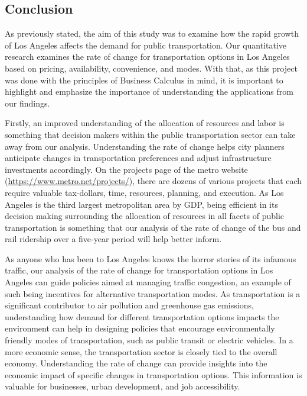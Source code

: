 \documentclass[
]{article}
\begin{document}
\newpage

\hypertarget{conclusion}{%
\subsection{Conclusion}\label{conclusion}}

As previously stated, the aim of this study was to examine how the rapid
growth of Los Angeles affects the demand for public transportation. Our
quantitative research examines the rate of change for transportation
options in Los Angeles based on pricing, availability, convenience, and
modes. With that, as this project was done with the principles of
Business Calculus in mind, it is important to highlight and emphasize
the importance of understanding the applications from our findings.~

\hfill\break

Firstly, an improved understanding of the allocation of resources and
labor is something that decision makers within the public transportation
sector can take away from our analysis. Understanding the rate of change
helps city planners anticipate changes in transportation preferences and
adjust infrastructure investments accordingly. On the projects page of
the metro website (\url{https://www.metro.net/projects/}), there are
dozens of various projects that each require valuable tax-dollars, time,
resources, planning, and execution. As Los Angeles is the third largest
metropolitan area by GDP, being efficient in its decision making
surrounding the allocation of resources in all facets of public
transportation is something that our analysis of the rate of change of
the bus and rail ridership over a five-year period will help better
inform.~

\hfill\break

As anyone who has been to Los Angeles knows the horror stories of its
infamous traffic, our analysis of the rate of change for transportation
options in Los Angeles can guide policies aimed at managing traffic
congestion, an example of such being incentives for alternative
transportation modes. As transportation is a significant contributor to
air pollution and greenhouse gas emissions, understanding how demand for
different transportation options impacts the environment can help in
designing policies that encourage environmentally friendly modes of
transportation, such as public transit or electric vehicles. In a more
economic sense, the transportation sector is closely tied to the overall
economy. Understanding the rate of change can provide insights into the
economic impact of specific changes in transportation options. This
information is valuable for businesses, urban development, and job
accessibility.
\end{document}
